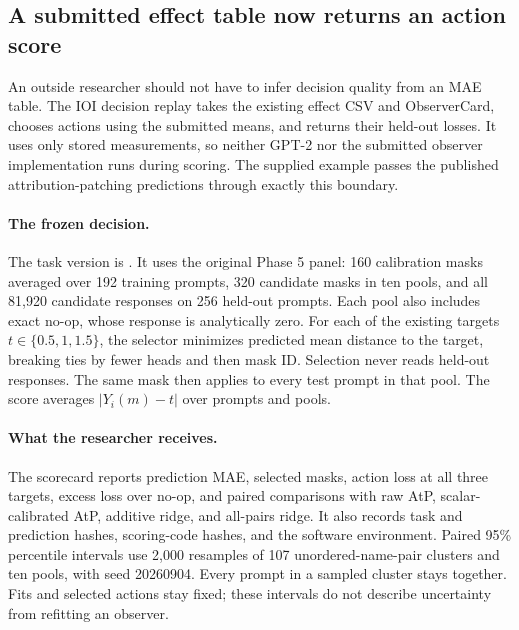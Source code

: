 \subsection{A submitted effect table now returns an action score}
\label{app:ioi-decision-replay}

An outside researcher should not have to infer decision quality from an MAE
table. The IOI decision replay takes the existing effect CSV and ObserverCard,
chooses actions using the submitted means, and returns their held-out losses.
It uses only stored measurements, so neither GPT-2 nor the submitted observer
implementation runs during scoring. The supplied example passes the published
attribution-patching predictions through exactly this boundary.

\paragraph{The frozen decision.}
The task version is
.
It uses the original Phase 5 panel: 160 calibration masks averaged over
192 training prompts, 320 candidate masks in ten pools, and all 81,920
candidate responses on 256 held-out prompts. Each pool also includes exact
no-op, whose response is analytically zero. For each of the existing targets
$t\in\{0.5,1,1.5\}$, the selector minimizes predicted mean distance to the
target, breaking ties by fewer heads and then mask ID. Selection never reads
held-out responses. The same mask then applies to every test prompt in that
pool. The score averages $|Y_i(m)-t|$ over prompts and pools.

\paragraph{What the researcher receives.}
The scorecard reports prediction MAE, selected masks, action loss at all three
targets, excess loss over no-op, and paired comparisons with raw AtP,
scalar-calibrated AtP, additive ridge, and all-pairs ridge. It also records
task and prediction hashes, scoring-code hashes, and the software environment.
Paired 95\% percentile intervals use 2,000 resamples of 107 unordered-name-pair
clusters and ten pools, with seed 20260904. Every prompt in a sampled cluster
stays together. Fits and selected actions stay fixed; these intervals do not
describe uncertainty from refitting an observer.

